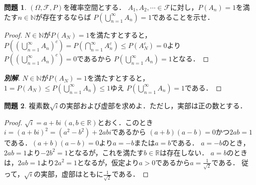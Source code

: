 \documentclass{jsarticle}
\theoremstyle{definition}
\newtheorem{qst}{問題}
\begin{document}
\begin{qst}
$(\Omega,\mathcal{F},P)$を確率空間とする．
$A_1,A_2,\cdots\in\mathcal{F}$に対し，$P(A_n)=1$を満たす$n\in\mathbb{N}$が存在するならば
$P(\bigcup_{n=1}^\infty A_n)=1$であることを示せ．
\end{qst}
\begin{proof}
$N\in\mathbb{N}$が$P(A_N)=1$を満たすとすると，
$P((\bigcup_{n=1}^\infty A_n)^c)=P(\bigcap_{n=1}^\infty A_n^c)\leq P(A_N^c)=0$より
$P((\bigcup_{n=1}^\infty A_n)^c)=0$であるから
$P(\bigcup_{n=1}^\infty A_n)=1$となる．
\end{proof}
\begin{proof}[\textbf{別解}]
$N\in\mathbb{N}$が$P(A_N)=1$を満たすとすると，
$1=P(A_N)\leq P(\bigcup_{n=1}^\infty A_n)\leq1$ゆえ
$P(\bigcup_{n=1}^\infty A_n)=1$である．
\end{proof}

\begin{qst}
複素数$\sqrt{i}$の実部および虚部を求めよ．ただし，実部は正の数とする．
\end{qst}
\begin{proof}
$\sqrt{i}=a+bi\ (a,b\in\mathbb{R})$とおく．このとき$i=(a+bi)^2=(a^2-b^2)+2abi$であるから
$(a+b)(a-b)=0$かつ$2ab=1$である．$(a+b)(a-b)=0$より$a=-b$または$a=b$である．
$a=-b$のとき，$2ab=1$より$-2b^2=1$となるが，これを満たす$b\in\mathbb{R}$は存在しない．
$a=b$のときは，$2ab=1$より$2a^2=1$となるが，仮定より$a>0$であるから$a=\frac{1}{\sqrt{2}}$である．
従って，$\sqrt{i}$の実部，虚部はともに$\frac{1}{\sqrt{2}}$である．
\end{proof}
\end{document}
